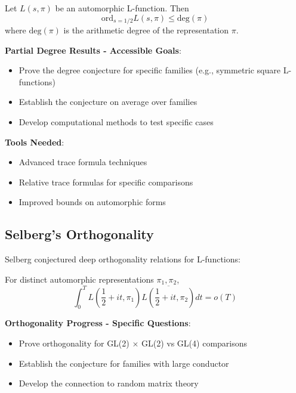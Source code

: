\begin{conjecture}
Let $L(s, \pi)$ be an automorphic L-function. Then
\begin{equation}
\text{ord}_{s=1/2} L(s, \pi) \leq \text{deg}(\pi)
\end{equation}
where $\text{deg}(\pi)$ is the arithmetic degree of the representation $\pi$.
\end{conjecture}

\noindent\textbf{Partial Degree Results - Accessible Goals}:
\begin{itemize}
\item Prove the degree conjecture for specific families (e.g., symmetric square L-functions)
\item Establish the conjecture on average over families
\item Develop computational methods to test specific cases
\end{itemize}

\textbf{Tools Needed}:
\begin{itemize}
\item Advanced trace formula techniques
\item Relative trace formulas for specific comparisons
\item Improved bounds on automorphic forms
\end{itemize}

\subsection{Selberg's Orthogonality}
\label{subsec:selberg_orthogonality}

Selberg conjectured deep orthogonality relations for L-functions:

\begin{conjecture}
For distinct automorphic representations $\pi_1, \pi_2$,
\begin{equation}
\int_0^T L\left(\frac{1}{2} + it, \pi_1\right) \overline{L\left(\frac{1}{2} + it, \pi_2\right)} dt = o(T)
\end{equation}
\end{conjecture}

\noindent\textbf{Orthogonality Progress - Specific Questions}:
\begin{itemize}
\item Prove orthogonality for GL(2) $\times$ GL(2) vs GL(4) comparisons
\item Establish the conjecture for families with large conductor
\item Develop the connection to random matrix theory
\end{itemize}


